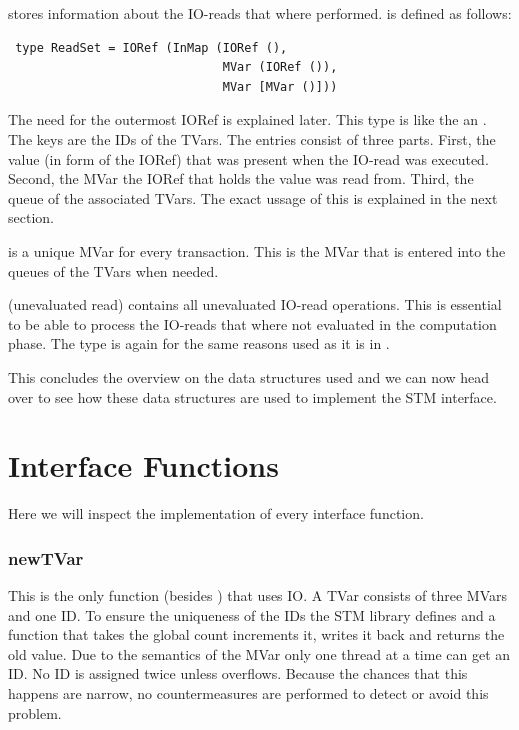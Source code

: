  stores information about the IO-reads that where performed. 
is defined as follows:
\begin{lstlisting}
 type ReadSet = IORef (InMap (IORef (), 
                              MVar (IORef ()), 
                              MVar [MVar ()]))
\end{lstlisting}
The need for the outermost IORef is explained later. This type is like the  an 
. The keys are the IDs of the TVars. The entries consist of three parts. First,
the value (in form of the IORef) that was present when the IO-read was executed. Second, the 
MVar the IORef that holds the value was read from. Third, the queue of the associated TVars.
The exact ussage of this is explained in the next section.

 is a unique MVar for every transaction. This is the MVar that is entered into
the queues of the TVars when needed.

(unevaluated read) contains all unevaluated IO-read operations. This is essential to be able to 
process the IO-reads that where not evaluated in the computation phase. The  type
is again for the same reasons used as it is in .

This concludes the overview on the data structures used and we can now head over to see how these
data structures are used to implement the STM interface.





\section{Interface Functions}
\label{sec:IFFun}
Here we will inspect the implementation of every interface function. 

\subsubsection{newTVar}
This is the only function (besides ) that uses IO. A TVar consists of three MVars
and one ID. To ensure the uniqueness of the IDs the STM library defines 
and a function  that takes the global count increments it, writes it back 
and returns the old value. Due to the semantics of the MVar only one thread at a time can get an ID. 
No ID is assigned twice unless  overflows. Because the chances that this happens 
are narrow, no countermeasures are performed to detect or avoid this problem. 


